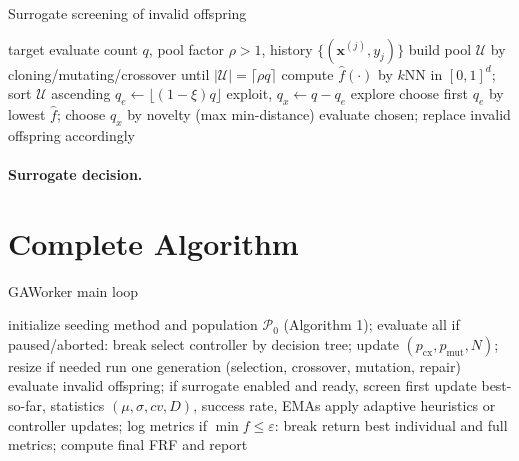 \documentclass[12pt,a4paper]{article}
\begin{document}
\begin{algorithm}[H]
\caption{Surrogate screening of invalid offspring}
\begin{algorithmic}[1]
\Require target evaluate count $q$, pool factor $\rho>1$, history $\{(\bm{x}^{(j)},y_j)\}$
\State build pool $\mathcal{U}$ by cloning/mutating/crossover until $|\mathcal{U}|=\lceil \rho q\rceil$
\State compute $\hat{f}(\cdot)$ by $k$NN in $[0,1]^d$; sort $\mathcal{U}$ ascending
\State $q_e\leftarrow \lfloor (1-\xi) q\rfloor$ exploit, $q_x\leftarrow q-q_e$ explore
\State choose first $q_e$ by lowest $\hat{f}$; choose $q_x$ by novelty (max min-distance)
\State evaluate chosen; replace invalid offspring accordingly
\end{algorithmic}
\end{algorithm}

\paragraph{Surrogate decision.}
\begin{center}
\end{center}

\section{Complete Algorithm}
\begin{algorithm}[H]
\caption{GAWorker main loop}
\begin{algorithmic}[1]
\State initialize seeding method and population $\mathcal{P}_0$ (Algorithm 1); evaluate all
\State if paused/aborted: break
\State select controller by decision tree; update $(p_{\text{cx}},p_{\text{mut}},N)$; resize if needed
\State run one generation (selection, crossover, mutation, repair)
\State evaluate invalid offspring; if surrogate enabled and ready, screen first
\State update best-so-far, statistics $(\mu,\sigma,cv,D)$, success rate, EMAs
\State apply adaptive heuristics or controller updates; log metrics
\State if $\min f \le \varepsilon$: break
\EndFor
\State return best individual and full metrics; compute final FRF and report
\end{algorithmic}
\end{algorithm}
\end{document}
